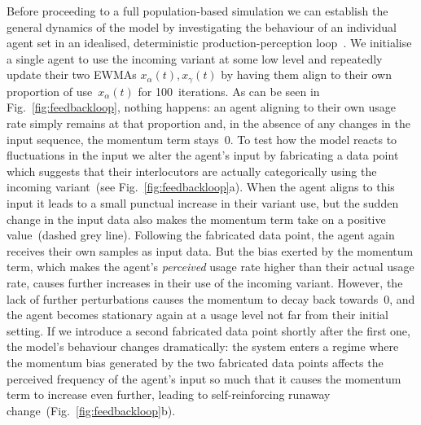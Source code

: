 Before proceeding to a full population-based simulation we can establish the general dynamics of the model by investigating the behaviour of an individual agent set in an idealised, deterministic production-perception loop~\citep{Wedel2006}.
We initialise a single agent to use the incoming variant at some low level and repeatedly update their two EWMAs $x_\alpha(t), x_\gamma(t)$ by having them align to their own proportion of use~$x_\alpha(t)$ for 100~iterations. As can be seen in Fig.~\ref{fig:feedbackloop}, nothing happens: an agent aligning to their own usage rate simply remains at that proportion and, in the absence of any changes in the input sequence, the momentum term stays~0. To test how the model reacts to fluctuations in the input we alter the agent's input by fabricating a data point which suggests that their interlocutors are actually categorically using the incoming variant~(see Fig.~\ref{fig:feedbackloop}a). When the agent aligns to this input it leads to a small punctual increase in their variant use, but the sudden change in the input data also makes the momentum term take on a positive value~(dashed grey line).
Following the fabricated data point, the agent again receives their own samples as input data. But the bias exerted by the momentum term, which makes the agent's \emph{perceived} usage rate higher than their actual usage rate, causes further increases in their use of the incoming variant. However, the lack of further perturbations causes the momentum to decay back towards~$0$, and the agent becomes stationary again at a usage level not far from their initial setting. If we introduce a second fabricated data point shortly after the first one, the model's behaviour changes dramatically: the system enters a regime where the momentum bias generated by the two fabricated data points affects the perceived frequency of the agent's input so much that it causes the momentum term to increase even further, leading to self-reinforcing runaway change~(Fig.~\ref{fig:feedbackloop}b).

